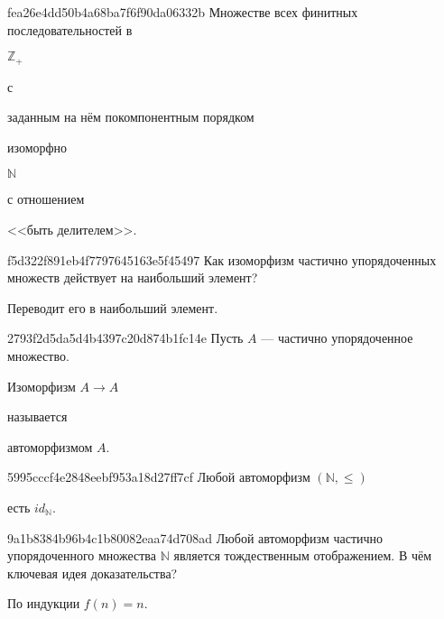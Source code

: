 \begin{note}{fea26e4dd50b4a68ba7f6f90da06332b}
    Множестве всех финитных последовательностей в \begin{icloze}{4}\({ \mathbb Z_+ }\)\end{icloze} с \begin{icloze}{3}заданным на нём покомпонентным порядком\end{icloze} изоморфно \begin{icloze}{2}\({ \mathbb N }\)\end{icloze} с отношением \begin{icloze}{1}<<быть делителем>>.\end{icloze}
\end{note}

\begin{note}{f5d322f891eb4f7797645163e5f45497}
    Как изоморфизм частично упорядоченных множеств действует на наибольший элемент?

    \begin{cloze}{1}
        Переводит его в наибольший элемент.
    \end{cloze}
\end{note}

\begin{note}{2793f2d5da5d4b4397c20d874b1fc14e}
    Пусть \({ A }\) --- частично упорядоченное множество.
    \begin{icloze}{2}Изоморфизм \({ A \to A }\)\end{icloze} называется \begin{icloze}{1}автоморфизмом \({ A }\).\end{icloze}
\end{note}

\begin{note}{5995cccf4e2848eebf953a18d27ff7cf}
    Любой автоморфизм \({ (\mathbb N, \leqslant) }\) \begin{icloze}{1}есть \({ id_{\mathbb N} }\).\end{icloze}
\end{note}

\begin{note}{9a1b8384b96b4c1b80082eaa74d708ad}
    Любой автоморфизм частично упорядоченного множества \({ \mathbb N }\) является тождественным отображением.
    В чём ключевая идея доказательства?

    \begin{cloze}{1}
        По индукции \({ f(n) = n }\).
    \end{cloze}
\end{note}

